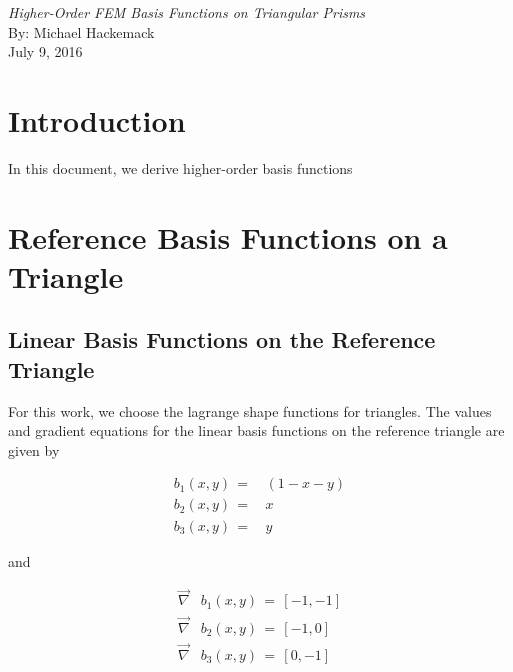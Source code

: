 \documentclass[11pt]{article}
\begin{document}
\begin{center}
{\em \huge Higher-Order FEM Basis Functions on Triangular Prisms}\\[8mm]
{\LARGE By: Michael Hackemack}\\[3mm]
{\large July 9, 2016} \\[15mm]
\end{center}



\section{Introduction}
\label{sec::Introduction}

In this document, we derive higher-order basis functions

\section{Reference Basis Functions on a Triangle}
\label{sec::triref}

\subsection{Linear Basis Functions on the Reference Triangle}
\label{sec::triref_linear}

For this work, we choose the lagrange shape functions for triangles. The values and gradient equations for the linear basis functions on the reference triangle are given by

\begin{equation}
\label{eq::reftri_quad_basis_vals}
\begin{aligned}
b_1(x,y) \, =& \, (1-x-y) \\
b_2(x,y) \, =& \, x \\
b_3(x,y) \, =& \, y
\end{aligned}
\end{equation}

\noindent and

\begin{equation}
\label{eq::reftri_quad_basis_grads}
\begin{aligned}
\vec{\nabla}& b_1(x,y) \, = \, \left[ -1 , -1   \right] \\
\vec{\nabla}& b_2(x,y) \, = \, \left[ -1, 0   \right] \\
\vec{\nabla}& b_3(x,y) \, = \, \left[ 0, -1   \right] 
\end{aligned}
\end{equation}
\end{document}

